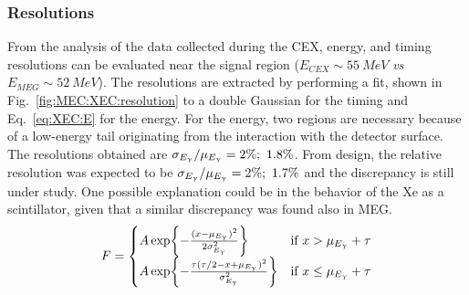 \begin{refsection}
        \subsubsection{Resolutions} 
        From the analysis of the data collected during the CEX, energy, and timing resolutions can be evaluated near the signal region ($E_{CEX}\sim\SI{55}{MeV}$ \textit{vs} $E_{MEG}\sim\SI{52}{MeV}$).
        The resolutions are extracted by performing a fit, shown in Fig.~\ref{fig:MEC:XEC:resolution} to a double Gaussian for the timing and Eq.~\ref{eq:XEC:E} for the energy.
        For the energy, two regions are necessary because of a low-energy tail originating from the interaction with the detector surface. 
        The resolutions obtained are $\sigma_{E_{\upgamma}}/\mu_{E_{\upgamma}} = 2\%;\ 1.8\%$.
        From design, the relative resolution was expected to be $\sigma_{E_{\upgamma}}/\mu_{E_{\upgamma}} = 2\%;\ 1.7\%$ and the discrepancy is still under study. One possible explanation could be in the behavior of the Xe as a scintillator, given that a similar discrepancy was found also in MEG.
        \begin{equation}
            \label{eq:XEC:E}
            F = 
            \begin{cases} 
                A\exp{-\frac{(x-\mu_{E_\upgamma})^2}{2\sigma_{E_\upgamma}^2}}&\text{if $x>\mu_{E_\upgamma}+\tau$}\\
                A\exp{-\frac{\tau(\tau/2-x+\mu_{E_\upgamma})^2}{\sigma_{E_\upgamma}^2}}&\text{if $x\le\mu_{E_\upgamma}+\tau$}
             \end{cases}
        \end{equation}
    

\end{refsection}
